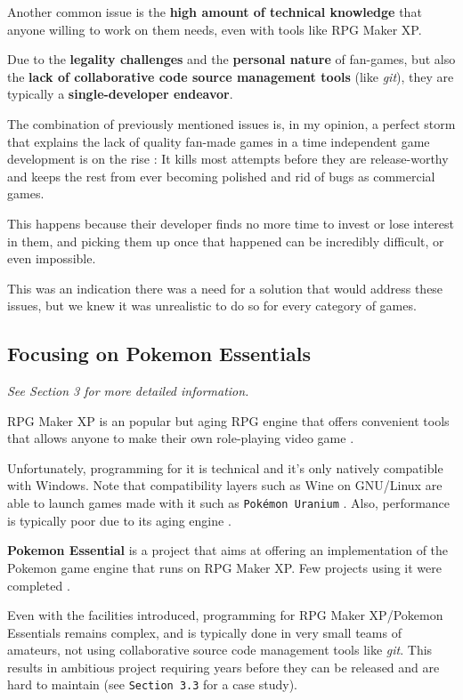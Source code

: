 \documentclass[11pt]{article}
\begin{document}
Another common issue is the \textbf{high amount of technical knowledge} that anyone willing to work on them needs, even with tools like RPG Maker XP.

Due to the \textbf{legality challenges} and the \textbf{personal nature} of fan-games, but also the \textbf{lack of collaborative code source management tools} (like \textit{git}), they are typically a \textbf{single-developer endeavor}. 

The combination of previously mentioned issues is, in my opinion, a perfect storm that explains the lack of quality fan-made games in a time independent game development is on the rise : It kills most attempts before they are release-worthy and keeps the rest from ever becoming polished and rid of bugs as commercial games. 

This happens because their developer finds no more time to invest or lose interest in them, and picking them up once that happened can be incredibly difficult, or even impossible.

This was an indication there was a need for a solution that would address these issues, but we knew it was unrealistic to do so for every category of games. 


\subsection{Focusing on Pokemon Essentials}

\textit{See Section 3 for more detailed information.}

RPG Maker XP is an popular but aging RPG engine that offers convenient tools that allows anyone to make their own role-playing video game \cite{RMXP}.

Unfortunately, programming for it is technical and it's only natively compatible with Windows. Note that compatibility layers such as Wine on GNU/Linux are able to launch games made with it such as \texttt{Pokémon Uranium} \cite{LutrisPU}. Also, performance is typically poor due to its aging engine \cite{PoorPerf}.

\textbf{Pokemon Essential} is a project that aims at offering an implementation of the Pokemon game engine that runs on RPG Maker XP. Few projects using it were completed \cite{PkmnFangames}.

Even with the facilities introduced, programming for RPG Maker XP/Pokemon Essentials remains complex, and is typically done in very small teams of amateurs, not using collaborative source code management tools like \textit{git}. This results in ambitious project requiring years before they can be released and are hard to maintain (see \texttt{Section 3.3} for a case study).
\end{document}

